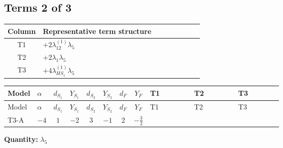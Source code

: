 \documentclass[8pt]{article}
\begin{document}
\begin{landscape}
\subsection*{Terms 2 of 3}
\begin{center}
\begin{tabular}{@{}c >{\raggedright\arraybackslash}p{0.82\linewidth}@{}}
\toprule
Column & Representative term structure \\
\midrule
T1 & \(\displaystyle +2 {\lambda_{12}^{(1)}} {\lambda_5}\) \\
\midrule
T2 & \(\displaystyle +2 {\lambda_1} {\lambda_5}\) \\
\midrule
T3 & \(\displaystyle +4 {\lambda_{HS_1}^{(1)}} {\lambda_5}\) \\
\midrule
\bottomrule
\end{tabular}
\end{center}
\smallskip
\tiny
\begin{longtable}{@{}llcccccc >{\raggedright\arraybackslash}p{0.21\linewidth} >{\raggedright\arraybackslash}p{0.21\linewidth} >{\raggedright\arraybackslash}p{0.21\linewidth}@{}}
\toprule
Model & $\alpha$ & $d_{S_1}$ & $Y_{S_1}$ & $d_{S_2}$ & $Y_{S_2}$ & $d_F$ & $Y_F$ & T1 & T2 & T3 \\
\midrule
\endfirsthead
\toprule
Model & $\alpha$ & $d_{S_1}$ & $Y_{S_1}$ & $d_{S_2}$ & $Y_{S_2}$ & $d_F$ & $Y_F$ & T1 & T2 & T3 \\
\midrule
\endhead
T3-A & $-4$ & $1$ & $-2$ & $3$ & $-1$ & $2$ & $-\frac{3}{2}$ & \scriptsize\adjustbox{max width=\linewidth}{$\begin{gathered} +2 {\lambda_{12}^{(1)}} {\lambda_5}\end{gathered}$} & \scriptsize\adjustbox{max width=\linewidth}{$\begin{gathered} +2 {\lambda_1} {\lambda_5}\end{gathered}$} & \scriptsize\adjustbox{max width=\linewidth}{$\begin{gathered} +4 {\lambda_{HS_1}^{(1)}} {\lambda_5}\end{gathered}$} \\
\midrule
\bottomrule
\end{longtable}
\clearpage
\noindent\textbf{Quantity: }$\lambda_5$\par\smallskip

\end{landscape}
\end{document}
